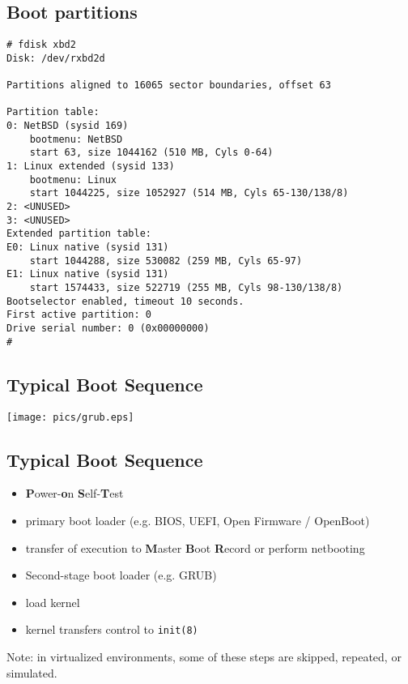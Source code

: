 \documentclass[xga]{xdvislides}
\begin{document}
\subsection{Boot partitions}
\smallish
\begin{verbatim}
# fdisk xbd2
Disk: /dev/rxbd2d

Partitions aligned to 16065 sector boundaries, offset 63

Partition table:
0: NetBSD (sysid 169)
    bootmenu: NetBSD
    start 63, size 1044162 (510 MB, Cyls 0-64)
1: Linux extended (sysid 133)
    bootmenu: Linux
    start 1044225, size 1052927 (514 MB, Cyls 65-130/138/8)
2: <UNUSED>
3: <UNUSED>
Extended partition table:
E0: Linux native (sysid 131)
    start 1044288, size 530082 (259 MB, Cyls 65-97)
E1: Linux native (sysid 131)
    start 1574433, size 522719 (255 MB, Cyls 98-130/138/8)
Bootselector enabled, timeout 10 seconds.
First active partition: 0
Drive serial number: 0 (0x00000000)
# 
\end{verbatim}
\Normalsize

\subsection{Typical Boot Sequence}
\vspace*{\fill}
\begin{center}
	\texttt{[image: pics/grub.eps]} \\
\end{center}
\vspace*{\fill}

\subsection{Typical Boot Sequence}
\begin{itemize}
	\item {\bf P}ower-{\bf o}n {\bf S}elf-{\bf T}est
	\item primary boot loader (e.g. BIOS, UEFI, Open Firmware / OpenBoot)
	\item transfer of execution to {\bf M}aster {\bf B}oot {\bf R}ecord or perform netbooting
	\item Second-stage boot loader (e.g. GRUB)
	\item load kernel
	\item kernel transfers control to {\tt init(8)}
\end{itemize}
\vspace{.5in}
Note: in virtualized environments, some of these steps
are skipped, repeated, or simulated. \\
\end{document}
